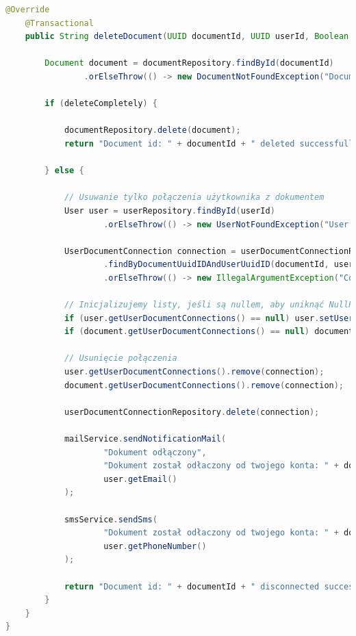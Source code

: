 \begin{lstlisting}[language=Java, style=JavaStyle, caption=Metoda usuwania dokumetów i konretnych połaczeń z dokumentami w klasie \texttt{DocumentServiceImp}]
 @Override
    @Transactional
    public String deleteDocument(UUID documentId, UUID userId, Boolean deleteCompletely) throws DocumentNotFoundException, UserNotFoundException, IllegalArgumentException {

        Document document = documentRepository.findById(documentId)
                .orElseThrow(() -> new DocumentNotFoundException("Document id: " + documentId + " not found"));

        if (deleteCompletely) {

            documentRepository.delete(document);
            return "Document id: " + documentId + " deleted successfully for all users";

        } else {

            // Usuwanie tylko połączenia użytkownika z dokumentem
            User user = userRepository.findById(userId)
                    .orElseThrow(() -> new UserNotFoundException("User id: " + userId + " not found"));

            UserDocumentConnection connection = userDocumentConnectionRepository
                    .findByDocumentUuidIDAndUserUuidID(documentId, userId)
                    .orElseThrow(() -> new IllegalArgumentException("Connection not found"));

            // Inicjalizujemy listy, jeśli są nullem, aby uniknąć NullPointerException
            if (user.getUserDocumentConnections() == null) user.setUserDocumentConnections(new ArrayList<>());
            if (document.getUserDocumentConnections() == null) document.setUserDocumentConnections(new ArrayList<>());

            // Usunięcie połączenia
            user.getUserDocumentConnections().remove(connection);
            document.getUserDocumentConnections().remove(connection);

            userDocumentConnectionRepository.delete(connection);

            mailService.sendNotificationMail(
                    "Dokument odłączony",
                    "Dokument został odłaczony od twojego konta: " + document.getDocumentName(),
                    user.getEmail()
            );

            smsService.sendSms(
                    "Dokument został odłaczony od twojego konta: " + document.getDocumentName(),
                    user.getPhoneNumber()
            );

            return "Document id: " + documentId + " disconnected successfully for user id: " + userId;
        }
    }
}
\end{lstlisting}


